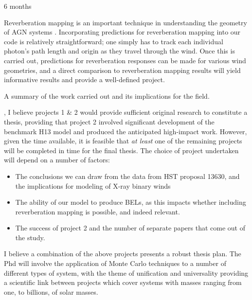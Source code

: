 \documentclass[useAMS,usenatbib,onecolumn]{mn2e2}
\begin{document}
\bigskip


 6 months

 Reverberation mapping is an important technique in understanding 
the geometry of AGN systems \citep{peterson1998}. Incorporating predictions for reverberation mapping
into our code is relatively straightforward; one simply has to track each individual 
photon's path length and origin as they travel through the wind. Once this is carried out,
predictions for reverberation responses can be made for various wind geometries, and a direct comparison
to reverberation mapping results will yield informative results and provide a well-defined project.

\bigskip

 A summary of the work carried out and its implications for the field.

\bigskip
{}, I believe projects 1 \& 2 would provide sufficient 
original research to constitute a thesis, providing that project 2 involved significant development
of the benchmark H13 model and produced the anticipated high-impact work. 
However, given the time available, it is feasible that {\sl at least} one of the remaining projects 
will be completed in time for the final thesis. The choice of project undertaken will depend on a number of factors:

\begin{itemize}
 	\item The conclusions we can draw from the data from HST proposal 13630, and the implications for 
 	      modeling of X-ray binary winds
 	\item The ability of our model to produce BELs, as this impacts whether including reverberation mapping is
 	      possible, and indeed relevant.
 	\item The success of project 2 and the number of separate papers that come out of the study. 
 \end{itemize} 

 I believe a combination of the above projects presents a robust thesis plan.
The Phd will involve the application of Monte Carlo techniques to a number of different types of system, 
with the theme of unification and universality providing a scientific link between projects which 
 cover systems with masses ranging from one, to billions, of solar masses.
\end{document}
